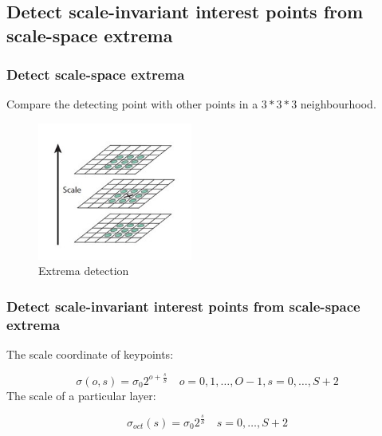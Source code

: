 \documentclass[notheorems, serif, table, compress]{beamer}  %
\begin{document}
\subsection{Detect scale-invariant interest points from scale-space extrema}
\begin{frame}[fragile]
\frametitle{Detect scale-space extrema}%
 Compare the detecting point with other points in a $3*3*3$ neighbourhood. %

\begin{figure}[!ht]
  \centering\includegraphics[width=2in]{kongjianjizhijiance.png}
  \caption{Extrema detection}
 \label{kongjianjizhijiance}
  \end{figure}


\end{frame}

\begin{frame}[fragile]
\frametitle{Detect scale-invariant interest points from scale-space extrema}%

The scale coordinate of keypoints:

\begin{equation}
\sigma(o,s)=\sigma_{0}2^{o+\frac{s}{S}}  \quad o=0,1,\ldots,O-1, s=0,\ldots,S+2
\end{equation}
The scale of a particular layer:

\begin{equation}
\sigma_{oct}(s)=\sigma_{0}2^{\frac{s}{S}}  \quad s=0,\ldots,S+2
\end{equation}
\end{frame}
\end{document}
